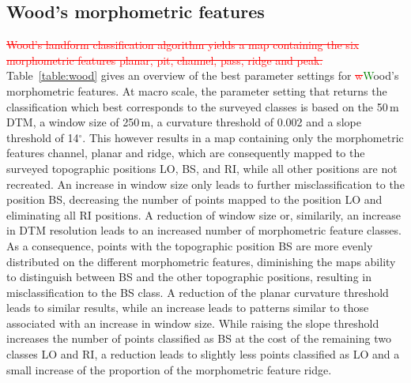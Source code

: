 \documentclass[preprint,12pt,authoryear]{elsarticle}
\begin{document}
\subsection{Wood's morphometric features}
\textcolor{red}{\sout{Wood's landform classification algorithm yields a map containing the six morphometric features planar, pit, channel, pass, ridge and peak.}} Table~\ref{table:wood} gives an overview of the best parameter settings for \textcolor{red}{\sout{w}}\textcolor{green}Wood's morphometric features.
At macro scale, the parameter setting that returns the classification which best corresponds to the surveyed classes is based on the 50\,m DTM, a window size of 250\,m, a curvature threshold of 0.002 and a slope threshold of 14$^{\circ}$. This however results in a map containing only the morphometric features channel, planar and ridge, which are consequently mapped to the surveyed topographic positions LO, BS, and RI, while all other positions are not recreated. An increase in window size only leads to further misclassification to the position BS, decreasing the number of points mapped to the position LO and eliminating all RI positions. A reduction of window size or, similarily, an increase in DTM resolution leads to an increased number of morphometric feature classes. As a consequence, points with the topographic position BS are more evenly distributed on the different morphometric features, diminishing the maps ability to distinguish between BS and the other topographic positions, resulting in misclassification to the BS class. A reduction of the planar curvature threshold leads to similar results, while an increase leads to patterns similar to those associated with an increase in window size. While raising the slope threshold increases the number of points classified as BS at the cost of the remaining two classes LO and RI, a reduction leads to slightly less points classified as LO and a small increase of the proportion of the morphometric feature ridge. 
\end{document}
